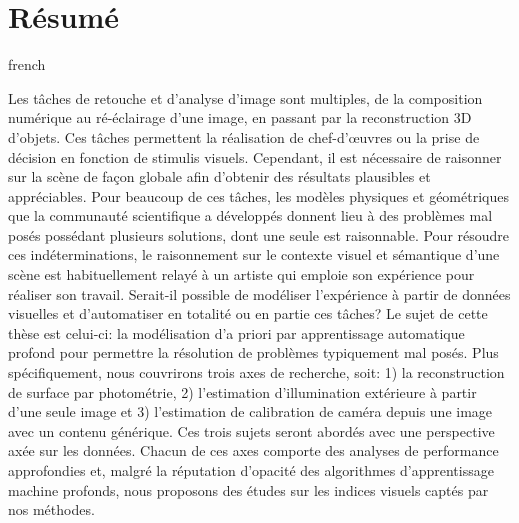 \chapter*{Résumé}                      %

\begin{otherlanguage*}{french}

Les tâches de retouche et d'analyse d'image sont multiples, de la composition numérique au ré-éclairage d'une image, en passant par la reconstruction 3D d'objets. Ces tâches permettent la réalisation de chef-d'\oe{}uvres ou la prise de décision en fonction de stimulis visuels. Cependant, il est nécessaire de raisonner sur la scène de façon globale afin d'obtenir des résultats plausibles et appréciables. Pour beaucoup de ces tâches, les modèles physiques et géométriques que la communauté scientifique a développés donnent lieu à des problèmes mal posés possédant plusieurs solutions, dont une seule est raisonnable. Pour résoudre ces indéterminations, le raisonnement sur le contexte visuel et sémantique d'une scène est habituellement relayé à un artiste qui emploie son expérience pour réaliser son travail. Serait-il possible de modéliser l'expérience à partir de données visuelles et d'automatiser en totalité ou en partie ces tâches? Le sujet de cette thèse est celui-ci: la modélisation d'a priori par apprentissage automatique profond pour permettre la résolution de problèmes typiquement mal posés. Plus spécifiquement, nous couvrirons trois axes de recherche, soit: 1) la reconstruction de surface par photométrie, 2) l'estimation d'illumination extérieure à partir d'une seule image et 3) l'estimation de calibration de caméra depuis une image avec un contenu générique. Ces trois sujets seront abordés avec une perspective axée sur les données. Chacun de ces axes comporte des analyses de performance approfondies et, malgré la réputation d'opacité des algorithmes d'apprentissage machine profonds, nous proposons des études sur les indices visuels captés par nos méthodes.

\end{otherlanguage*}
